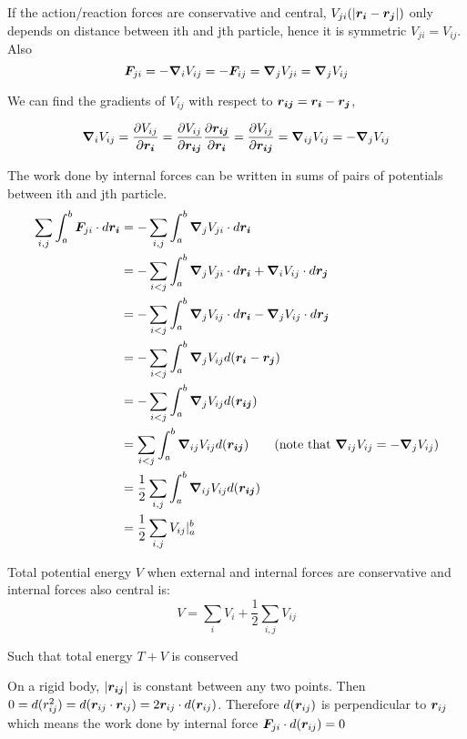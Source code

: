 \documentclass[12pt]{article}
\begin{document}
If the action/reaction forces are conservative and central,  $V_{ji}(|\boldsymbol{r_i} -\boldsymbol{r_j}|)$ only depends on distance between ith and jth particle, hence it is symmetric $V_{ji} = V_{ij}$. Also 
$$\boldsymbol{F}_{ji} = - \grad_{i}{V_{ij}} = - \boldsymbol{F}_{ij} =  \grad_{j}{V_{ji}} = \grad_{j}{V_{ij}} $$ 


We can find the gradients of $V_{ij}$ with respect to $\boldsymbol{r_{ij}} =\boldsymbol{r_i} -\boldsymbol{r_j}$, 

$$
 \grad_{i}{V_{ij}} = \frac{\partial V_{ij}}{\partial \boldsymbol{r_i}} = \frac{\partial V_{ij}}{\partial \boldsymbol{r_{ij}}} \frac{\partial   \boldsymbol{r_{ij}}}{\partial \boldsymbol{r_i}} = \frac{\partial V_{ij}}{\partial \boldsymbol{r_{ij}}} = \grad_{ij}{V_{ij}} = - \grad_{j}{V_{ij}}
$$

 The work done by internal forces can be written in sums of pairs of potentials between ith and jth particle.
$$
\begin{aligned}
	\sum_{i, j} \int_a^b \boldsymbol{F}_{ji} \cdot  d\boldsymbol{r_i}
	&= -\sum_{i, j} \int_a^b  \grad_{j}{V_{ji}} \cdot  d\boldsymbol{r_i} \\
	&= -\sum_{i < j} \int_a^b   \grad_{j}{V_{ji}} \cdot  d\boldsymbol{r_i} +  \grad_{i}{V_{ij}} \cdot  d\boldsymbol{r_j} \\
	&= -\sum_{i < j} \int_a^b   \grad_{j}{V_{ij}} \cdot  d\boldsymbol{r_i} -  \grad_{j}{V_{ij}} \cdot  d\boldsymbol{r_j} \\
	&= -\sum_{i < j} \int_a^b   \grad_{j}{V_{ij}} d(\boldsymbol{r_i} - \boldsymbol{r_j}) \\
	&= -\sum_{i < j} \int_a^b   \grad_{j}{V_{ij}} d(\boldsymbol{r_{ij}}) \\
	&=  \sum_{i < j} \int_a^b   \grad_{ij}{V_{ij}} d(\boldsymbol{r_{ij}}) \quad \quad (\textnormal{note that }\grad_{ij}{V_{ij}} = - \grad_{j}{V_{ij}}) \\
	&=  \frac{1}{2} \sum_{i,j} \int_a^b   \grad_{ij}{V_{ij}} d(\boldsymbol{r_{ij}}) \\
	&=  \frac{1}{2} \sum_{i,j} {V_{ij}} |^b_a
\end{aligned}
$$

\begin{theorem}
	\textnormal{Total potential energy $V$ when external and internal forces are conservative and internal forces also central is:}
	$$ V = \sum_i V_i  + \frac{1}{2} \sum_{i,j} {V_{ij}}$$
	
	\textnormal{Such that total energy $T + V$ is conserved}
\end{theorem}

On a rigid body, $|\boldsymbol{r_{ij}}|$ is constant between any two points. Then $0 = d(r_{ij}^2) = d(\boldsymbol{r}_{ij} \cdot \boldsymbol{r}_{ij}) = 2 \boldsymbol{r}_{ij} \cdot d(\boldsymbol{r}_{ij})$. Therefore $d(\boldsymbol{r}_{ij})$ is perpendicular to $\boldsymbol{r}_{ij}$ which means the work done by internal force $\boldsymbol{F}_{ji} \cdot d(\boldsymbol{r}_{ij}) = 0$
\end{document}
